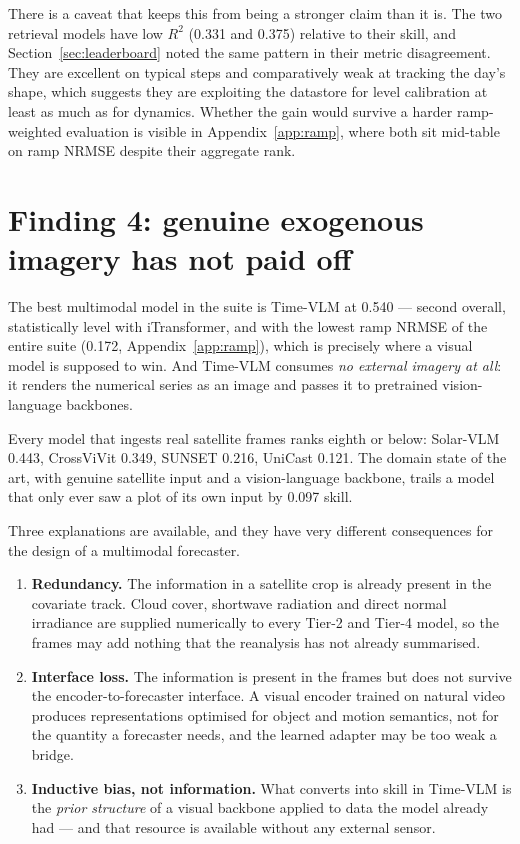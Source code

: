 There is a caveat that keeps this from being a stronger claim than it is. The two retrieval
models have low $R^2$ (0.331 and 0.375) relative to their skill, and Section~\ref{sec:leaderboard}
noted the same pattern in their metric disagreement. They are excellent on typical steps and
comparatively weak at tracking the day's shape, which suggests they are exploiting the
datastore for level calibration at least as much as for dynamics. Whether the gain would
survive a harder ramp-weighted evaluation is visible in Appendix~\ref{app:ramp}, where both
sit mid-table on ramp NRMSE despite their aggregate rank.

\section{Finding 4: genuine exogenous imagery has not paid off}
\label{sec:finding4}

The best multimodal model in the suite is Time-VLM at 0.540 --- second overall,
statistically level with iTransformer, and with the lowest ramp NRMSE of the entire suite
(0.172, Appendix~\ref{app:ramp}), which is precisely where a visual model is supposed to win.
And Time-VLM consumes \emph{no external imagery at all}: it renders the numerical series as
an image and passes it to pretrained vision-language backbones.

Every model that ingests real satellite frames ranks eighth or below: Solar-VLM 0.443,
CrossViVit 0.349, SUNSET 0.216, UniCast 0.121. The domain state of the art, with genuine
satellite input and a vision-language backbone, trails a model that only ever saw a plot of
its own input by 0.097 skill.

Three explanations are available, and they have very different consequences for the design of
a multimodal forecaster.

\begin{enumerate}
  \item \textbf{Redundancy.} The information in a satellite crop is already present in the
    covariate track. Cloud cover, shortwave radiation and direct normal irradiance are
    supplied numerically to every Tier-2 and Tier-4 model, so the frames may add nothing that
    the reanalysis has not already summarised.
  \item \textbf{Interface loss.} The information is present in the frames but does not survive
    the encoder-to-forecaster interface. A visual encoder trained on natural video produces
    representations optimised for object and motion semantics, not for the quantity a
    forecaster needs, and the learned adapter may be too weak a bridge.
  \item \textbf{Inductive bias, not information.} What converts into skill in Time-VLM is the
    \emph{prior structure} of a visual backbone applied to data the model already had --- and
    that resource is available without any external sensor.
\end{enumerate}

